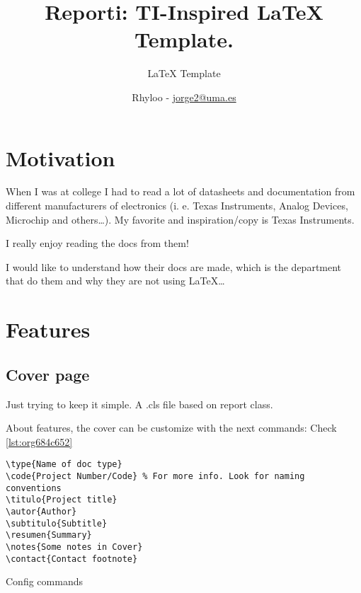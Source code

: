 \documentclass{reporti}
\date{}
\title{Reporti: TI-Inspired \LaTeX{} Template.}
\begin{document}
\subtitle{LaTeX Template}
\author{Rhyloo - \href{mailto:jorge2@uma.es}{jorge2@uma.es}}


\summary{}


\cover[width=1.35\textwidth][continue]


\section{Motivation}
\label{sec:orgfba59e4}

When I was at college I had to read a lot of datasheets and documentation from different manufacturers of electronics (i. e. Texas Instruments, Analog Devices, Microchip and others\ldots{}). My favorite and inspiration/copy is Texas Instruments.

I really enjoy reading the docs from them!

I would like to understand how their docs are made, which is the department that do them and why they are not using \LaTeX{}\ldots{} 

\section{Features}
\label{sec:org50fb53f}

\subsection{Cover page}
\label{sec:org89b5201}
Just trying to keep it simple. A .cls file based on report class.

About features, the cover can be customize with the next commands: Check \ref{lst:org684c652}

\begin{listing}[htbp]
\begin{verbatim}
\type{Name of doc type}
\code{Project Number/Code} % For more info. Look for naming conventions
\titulo{Project title} 
\autor{Author}
\subtitulo{Subtitle}
\resumen{Summary}
\notes{Some notes in Cover}
\contact{Contact footnote}
\end{verbatim}
\caption{\label{lst:org684c652}Config commands}
\end{listing}
\end{document}
